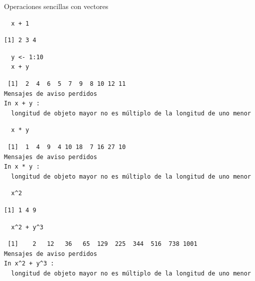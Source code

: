 \documentclass[xcolor={usenames,svgnames,dvipsnames}]{beamer}
\begin{document}
\begin{frame}[fragile,label=sec-2-1-2]{Operaciones sencillas con vectores}
 \lstset{language=R,label= ,caption= ,numbers=none}
\begin{lstlisting}
  x + 1
\end{lstlisting}

\begin{verbatim}
[1] 2 3 4
\end{verbatim}

\lstset{language=R,label= ,caption= ,numbers=none}
\begin{lstlisting}
  y <- 1:10
  x + y
\end{lstlisting}

\begin{verbatim}
 [1]  2  4  6  5  7  9  8 10 12 11
Mensajes de aviso perdidos
In x + y :
  longitud de objeto mayor no es múltiplo de la longitud de uno menor
\end{verbatim}

\lstset{language=R,label= ,caption= ,numbers=none}
\begin{lstlisting}
  x * y
\end{lstlisting}

\begin{verbatim}
 [1]  1  4  9  4 10 18  7 16 27 10
Mensajes de aviso perdidos
In x * y :
  longitud de objeto mayor no es múltiplo de la longitud de uno menor
\end{verbatim}

\lstset{language=R,label= ,caption= ,numbers=none}
\begin{lstlisting}
  x^2
\end{lstlisting}

\begin{verbatim}
[1] 1 4 9
\end{verbatim}

\lstset{language=R,label= ,caption= ,numbers=none}
\begin{lstlisting}
  x^2 + y^3
\end{lstlisting}

\begin{verbatim}
 [1]    2   12   36   65  129  225  344  516  738 1001
Mensajes de aviso perdidos
In x^2 + y^3 :
  longitud de objeto mayor no es múltiplo de la longitud de uno menor
\end{verbatim}
\end{frame}
\end{document}
